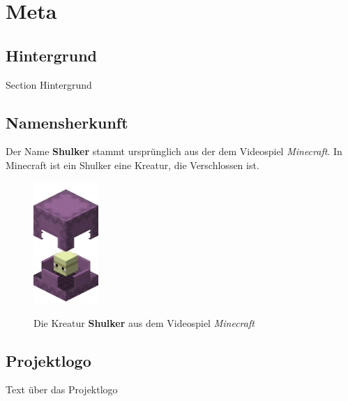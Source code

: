 \chapter{Meta}

\section{Hintergrund}

Section Hintergrund

\section{Namensherkunft}

Der Name \textbf{Shulker} stammt ursprünglich aus der dem Videospiel \textit{Minecraft}. In Minecraft ist ein Shulker eine Kreatur, die Verschlossen ist.

\begin{figure}[H]
    \begin{center}
        \includegraphics[width=0.22\textwidth]{images/Intro/Shulker.png}
        \caption{Die Kreatur \textbf{Shulker} aus dem Videospiel \textit{Minecraft}}
        \cite{mcwiki2015}
    \end{center}
\end{figure}

\newpage

\section{Projektlogo}

Text über das Projektlogo
